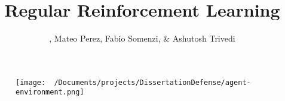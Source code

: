 \documentclass[
    hyperref = {hidelinks, linkcolor = black},
    xcolor = {dvipsnames},
    10pt
    aspectration = 169
]{beamer}
\title{Regular Reinforcement Learning}
\author{\teal{Taylor Dohmen}, Mateo Perez, Fabio Somenzi, \& Ashutosh Trivedi}
\institute{University of Colorado Boulder}
\begin{document}
    \begin{frame}
        \maketitle
    \end{frame}


    

    \begin{frame}
        \begin{figure}
            \centering
            \texttt{[image: ~/Documents/projects/DissertationDefense/agent-environment.png]}
        \end{figure}
    \end{frame}
    

\end{document}
